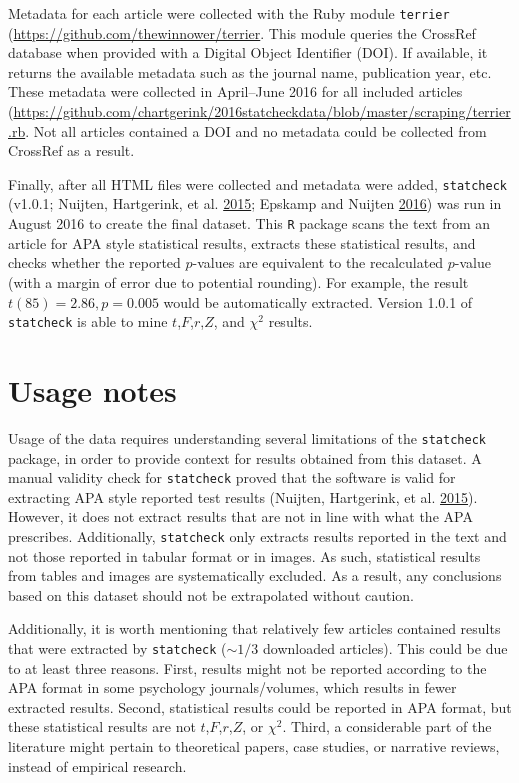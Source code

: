 \documentclass[a5paper]{book}
\begin{document}
Metadata for each article were collected with the Ruby module
\texttt{terrier} (\url{https://github.com/thewinnower/terrier}. This
module queries the CrossRef database when provided with a Digital Object
Identifier (DOI). If available, it returns the available metadata such
as the journal name, publication year, etc. These metadata were
collected in April--June 2016 for all included articles
(\url{https://github.com/chartgerink/2016statcheckdata/blob/master/scraping/terrier.rb}.
Not all articles contained a DOI and no metadata could be collected from
CrossRef as a result.

Finally, after all HTML files were collected and metadata were added,
\texttt{statcheck} (v1.0.1; Nuijten, Hartgerink, et al.
\protect\hyperlink{ref-doi:10.3758ux2fs13428-015-0664-2}{2015}; Epskamp
and Nuijten \protect\hyperlink{ref-statcheck}{2016}) was run in August
2016 to create the final dataset. This \texttt{R} package scans the text
from an article for APA style statistical results, extracts these
statistical results, and checks whether the reported \(p\)-values are
equivalent to the recalculated \(p\)-value (with a margin of error due
to potential rounding). For example, the result \(t(85)=2.86,p=0.005\)
would be automatically extracted. Version 1.0.1 of \texttt{statcheck} is
able to mine \(t\),\(F\),\(r\),\(Z\), and \(\chi^2\) results.

\section{Usage notes}\label{usage-notes}

Usage of the data requires understanding several limitations of the
\texttt{statcheck} package, in order to provide context for results
obtained from this dataset. A manual validity check for
\texttt{statcheck} proved that the software is valid for extracting APA
style reported test results (Nuijten, Hartgerink, et al.
\protect\hyperlink{ref-doi:10.3758ux2fs13428-015-0664-2}{2015}).
However, it does not extract results that are not in line with what the
APA prescribes. Additionally, \texttt{statcheck} only extracts results
reported in the text and not those reported in tabular format or in
images. As such, statistical results from tables and images are
systematically excluded. As a result, any conclusions based on this
dataset should not be extrapolated without caution.

Additionally, it is worth mentioning that relatively few articles
contained results that were extracted by \texttt{statcheck} (\(\sim1/3\)
downloaded articles). This could be due to at least three reasons.
First, results might not be reported according to the APA format in some
psychology journals/volumes, which results in fewer extracted results.
Second, statistical results could be reported in APA format, but these
statistical results are not \(t\),\(F\),\(r\),\(Z\), or \(\chi^2\).
Third, a considerable part of the literature might pertain to
theoretical papers, case studies, or narrative reviews, instead of
empirical research.
\end{document}
